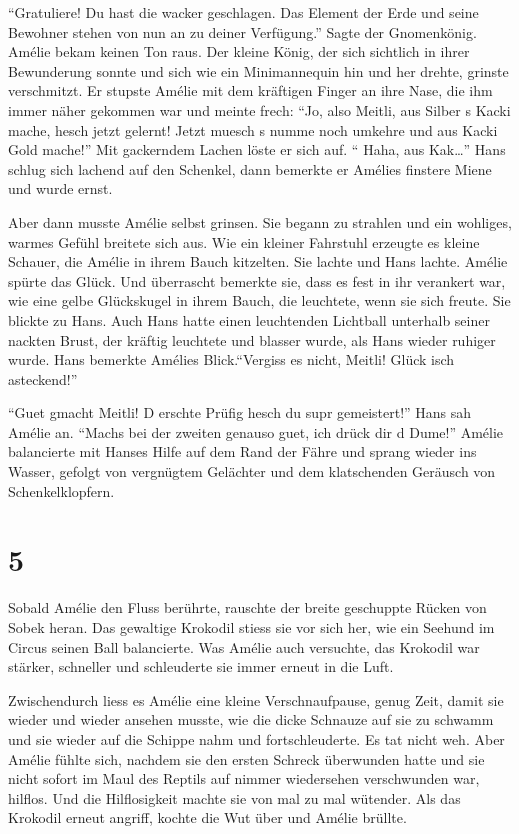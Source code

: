 \documentclass[11pt,titlepage,a5paper]{book}
\begin{document}
"`Gratuliere! Du hast die wacker geschlagen. Das Element der Erde und seine Bewohner stehen von nun an zu deiner Verfügung."' Sagte der Gnomenkönig. Amélie bekam keinen Ton raus. Der kleine König, der sich sichtlich in ihrer Bewunderung sonnte und sich wie ein Minimannequin hin und her drehte, grinste verschmitzt. Er stupste Amélie mit dem kräftigen Finger an ihre Nase, die ihm immer näher gekommen war und meinte frech: "`Jo, also Meitli, aus Silber s Kacki mache, hesch jetzt gelernt! Jetzt muesch s numme noch umkehre und aus Kacki Gold mache!"' Mit gackerndem Lachen löste er sich auf. "` Haha, aus Kak\dots"' Hans schlug sich lachend auf den Schenkel, dann bemerkte er Amélies finstere Miene und wurde ernst.

Aber dann musste Amélie selbst grinsen. Sie begann zu strahlen und ein wohliges, warmes Gefühl breitete sich aus. Wie ein kleiner Fahrstuhl erzeugte es kleine Schauer, die Amélie in ihrem Bauch kitzelten. Sie lachte und Hans lachte. Amélie spürte das Glück. Und überrascht bemerkte sie, dass es fest in ihr verankert war, wie eine gelbe Glückskugel in ihrem Bauch, die leuchtete, wenn sie sich freute. Sie blickte zu Hans. Auch Hans hatte einen leuchtenden Lichtball unterhalb seiner nackten Brust, der kräftig leuchtete und blasser wurde, als Hans wieder ruhiger wurde. Hans bemerkte Amélies Blick."`Vergiss es nicht, Meitli! Glück isch asteckend!"'

"`Guet gmacht Meitli! D erschte Prüfig hesch du supr gemeistert!"' Hans sah Amélie an. "`Machs bei der zweiten genauso guet, ich drück dir d Dume!"' Amélie balancierte mit Hanses Hilfe auf dem Rand der Fähre und sprang wieder ins Wasser, gefolgt von vergnügtem Gelächter und dem klatschenden Geräusch von Schenkelklopfern.

\section*{5}

Sobald Amélie den Fluss berührte, rauschte der breite geschuppte Rücken von Sobek heran. Das gewaltige Krokodil stiess sie vor sich her, wie ein Seehund im Circus seinen Ball balancierte. Was Amélie auch versuchte, das Krokodil war stärker, schneller und schleuderte sie immer erneut in die Luft.

Zwischendurch liess es Amélie eine kleine Verschnaufpause, genug Zeit, damit sie wieder und wieder ansehen musste, wie die dicke Schnauze auf sie zu schwamm und sie wieder auf die Schippe nahm und fortschleuderte. Es tat nicht weh. Aber Amélie fühlte sich, nachdem sie den ersten Schreck überwunden hatte und sie nicht sofort im Maul des Reptils auf nimmer wiedersehen verschwunden war, hilflos. Und die Hilflosigkeit machte sie von mal zu mal wütender. Als das Krokodil erneut angriff, kochte die Wut über und Amélie brüllte.
\end{document}
